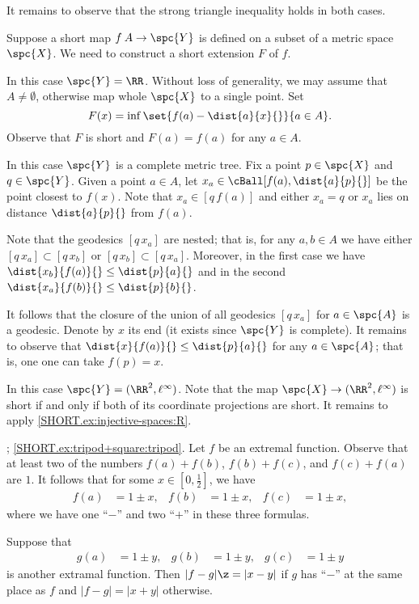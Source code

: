 It remains to observe that the strong triangle inequality holds in both cases.

Suppose a short map $f\:A\to\spc{Y}$ is defined on a subset of a metric space $\spc{X}$.
We need to construct a short extension $F$ of $f$.

In this case $\spc{Y}=\RR$.
Without loss of generality, we may assume that $A\ne\emptyset$, otherwise map whole $\spc{X}$ to a single point.
Set 
\[F(x)=\inf\set{f(a)-\dist{a}{x}{}}{a\in A}.\] 
Observe that $F$ is short and $F(a)=f(a)$ for any $a\in A$.

In this case $\spc{Y}$ is a complete metric tree.
Fix a point $p\in \spc{X}$ and $q\in\spc{Y}$.
Given a point $a\in A$,
let $x_a\in\cBall[f(a),\dist{a}{p}{}]$ be the point closest to $f(x)$.
Note that $x_a\in[q\,f(a)]$ and either $x_a=q$ or $x_a$ lies on distance $\dist{a}{p}{}$ from $f(a)$.

Note that the geodesics $[q\,x_a]$ are nested;
that is, for any $a,b\in A$ we have either $[q\,x_a]\subset [q\,x_b]$ or $[q\,x_b]\subset [q\,x_a]$.
Moreover, in the first case we have $\dist{x_b}{f(a)}{}\le \dist{p}{a}{}$ and in the second $\dist{x_a}{f(b)}{}\le \dist{p}{b}{}$.

It follows that the closure of the union of all geodesics $[q\,x_a]$ for $a\in\spc{A}$ is a geodesic.
Denote by $x$ its end (it exists since $\spc{Y}$ is complete).
It remains to observe that $\dist{x}{f(a)}{}\le \dist{p}{a}{}$ for any $a\in\spc{A}$;
that is, one one can take $f(p)=x$.

In this case $\spc{Y}=(\RR^2,\ell^\infty)$.
Note that the map $\spc{X}\to (\RR^2,\ell^\infty)$ is short if and only if both of its coordinate projections are short.
It remains to apply \ref{SHORT.ex:injective-spaces:R}.

; \ref{SHORT.ex:tripod+square:tripod}.
Let $f$ be an extremal function.
Observe that at least two of the numbers $f(a)+f(b)$, $f(b)+f(c)$, and $f(c)+f(a)$ are $1$.
It follows that for some $x\in[0,\tfrac12]$, we have 
\begin{align*}
f(a)&=1\pm x,&
f(b)&=1\pm x,&
f(c)&=1\pm x,
\end{align*}
where we have one ``$-$'' and two ``$+$'' in these three formulas.

Suppose that
\begin{align*}
g(a)&=1\pm y,& g(b)&=1\pm y,& g(c)&=1\pm y
\end{align*}
is another extramal function.
Then $|f-g|\z=|x-y|$ if $g$ has ``$-$'' at the same place as $f$ and $|f-g|=|x+y|$ otherwise.

